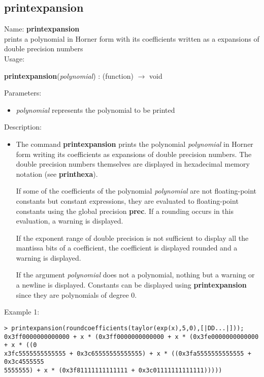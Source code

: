 \subsection{printexpansion}
\label{labprintexpansion}
\noindent Name: \textbf{printexpansion}\\
prints a polynomial in Horner form with its coefficients written as a expansions of double precision numbers\\

\noindent Usage: 
\begin{center}
\textbf{printexpansion}(\emph{polynomial}) : (\textsf{function}) $\rightarrow$ \textsf{void}\\
\end{center}
Parameters: 
\begin{itemize}
\item \emph{polynomial} represents the polynomial to be printed
\end{itemize}
\noindent Description: \begin{itemize}

\item The command \textbf{printexpansion} prints the polynomial \emph{polynomial} in Horner form
   writing its coefficients as expansions of double precision
   numbers. The double precision numbers themselves are displayed in
   hexadecimal memory notation (see \textbf{printhexa}). 
    
   If some of the coefficients of the polynomial \emph{polynomial} are not
   floating-point constants but constant expressions, they are evaluated
   to floating-point constants using the global precision \textbf{prec}.  If a
   rounding occurs in this evaluation, a warning is displayed.
    
   If the exponent range of double precision is not sufficient to display
   all the mantissa bits of a coefficient, the coefficient is displayed
   rounded and a warning is displayed.
    
   If the argument \emph{polynomial} does not a polynomial, nothing but a
   warning or a newline is displayed. Constants can be displayed using
   \textbf{printexpansion} since they are polynomials of degree $0$.
\end{itemize}
\noindent Example 1: 
\begin{center}\begin{minipage}{15cm}\begin{Verbatim}[frame=single]
> printexpansion(roundcoefficients(taylor(exp(x),5,0),[|DD...|]));
0x3ff0000000000000 + x * (0x3ff0000000000000 + x * (0x3fe0000000000000 + x * ((0
x3fc5555555555555 + 0x3c65555555555555) + x * ((0x3fa5555555555555 + 0x3c4555555
5555555) + x * (0x3f81111111111111 + 0x3c01111111111111)))))
\end{Verbatim}
\end{minipage}\end{center}
